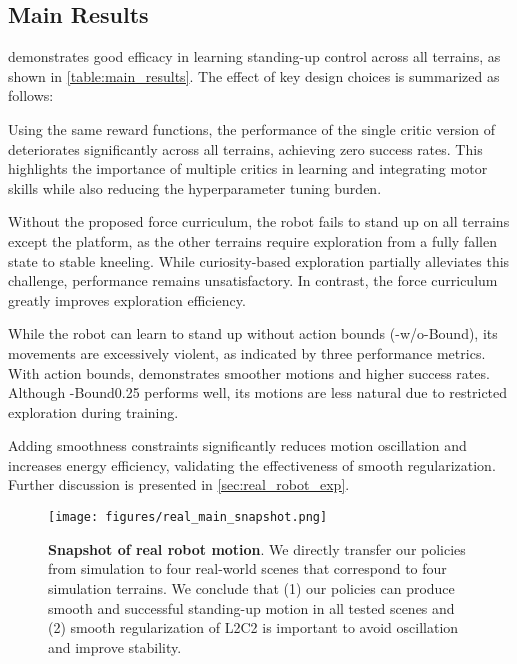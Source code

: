 \subsection{Main Results} 
\ours demonstrates good efficacy in learning standing-up control across all terrains, as shown in \cref{table:main_results}. The effect of key design choices is summarized as follows:

 Using the same reward functions, the performance of the single critic version of \ours deteriorates significantly across all terrains, achieving zero success rates. This highlights the importance of multiple critics in learning and integrating motor skills while also reducing the hyperparameter tuning burden.

 Without the proposed force curriculum, the robot fails to stand up on all terrains except the platform, as the other terrains require exploration from a fully fallen state to stable kneeling. While curiosity-based exploration partially alleviates this challenge, performance remains unsatisfactory. In contrast, the force curriculum greatly improves exploration efficiency.

  While the robot can learn to stand up without action bounds (\ours-w/o-Bound), its movements are excessively violent, as indicated by three performance metrics. With action bounds, \ours demonstrates smoother motions and higher success rates. Although \ours-Bound0.25 performs well, its motions are less natural due to restricted exploration during training.

 Adding smoothness constraints significantly reduces motion oscillation and increases energy efficiency, validating the effectiveness of smooth regularization. Further discussion is presented in \cref{sec:real_robot_exp}.


\begin{figure*}[t]
    \centering
    \texttt{[image: figures/real\_main\_snapshot.png]}
    \caption{\textbf{Snapshot of real robot motion}. We directly transfer our policies from simulation to four real-world scenes that correspond to four simulation terrains. We conclude that (1) our policies can produce smooth and successful standing-up motion in all tested scenes and (2) smooth regularization of L2C2 is important to avoid oscillation and improve stability.}
    \label{fig:real_snapshot}
    \vspace{-0.05in}
\end{figure*}

